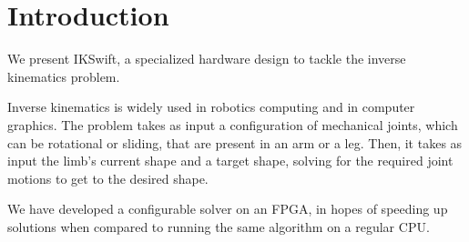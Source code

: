 \section{Introduction}

We present IKSwift, a specialized hardware design to tackle the inverse kinematics problem.

Inverse kinematics is widely used in robotics computing and in computer graphics. The problem takes as input a configuration of mechanical joints, which can be rotational or sliding, that are present in an arm or a leg. Then, it takes as input the limb's current shape and a target shape, solving for the required joint motions to get to the desired shape.

We have developed a configurable solver on an FPGA,
in hopes of speeding up solutions when compared to running the same algorithm on a regular CPU.

